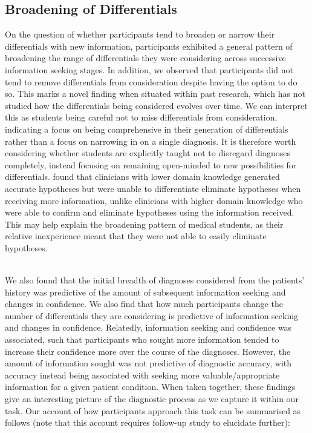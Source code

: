 \documentclass[a4paper, nobind]{templates/ociamthesis}
\begin{document}
\subsection*{Broadening of Differentials}\label{broadening-of-differentials}

On the question of whether participants tend to broaden or narrow their differentials with new information, participants exhibited a general pattern of broadening the range of differentials they were considering across successive information seeking stages. In addition, we observed that participants did not tend to remove differentials from consideration despite having the option to do so. This marks a novel finding when situated within past research, which has not studied how the differentials being considered evolves over time. We can interpret this as students being careful not to miss differentials from consideration, indicating a focus on being comprehensive in their generation of differentials rather than a focus on narrowing in on a single diagnosis. It is therefore worth considering whether students are explicitly taught not to disregard diagnoses completely, instead focusing on remaining open-minded to new possibilities for differentials. \autocite{joseph_domain_1990} found that clinicians with lower domain knowledge generated accurate hypotheses but were unable to differentiate eliminate hypotheses when receiving more information, unlike clinicians with higher domain knowledge who were able to confirm and eliminate hypotheses using the information received. This may help explain the broadening pattern of medical students, as their relative inexperience meant that they were not able to easily eliminate hypotheses.\\
\strut \\

We also found that the initial breadth of diagnoses considered from the patients' history was predictive of the amount of subsequent information seeking and changes in confidence. We also find that how much participants change the number of differentials they are considering is predictive of information seeking and changes in confidence. Relatedly, information seeking and confidence was associated, such that participants who sought more information tended to increase their confidence more over the course of the diagnoses. However, the amount of information sought was not predictive of diagnostic accuracy, with accuracy instead being associated with seeking more valuable/appropriate information for a given patient condition. When taken together, these findings give an interesting picture of the diagnostic process as we capture it within our task. Our account of how participants approach this task can be summarised as follows (note that this account requires follow-up study to elucidate further):
\end{document}
